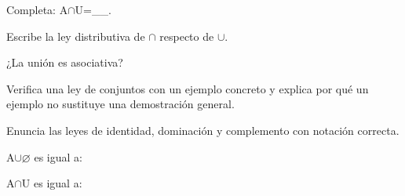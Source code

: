 \begin{activity}[id=dia-19-corta-04,type=short,weight=1]

Completa: A\(\cap\)U=__.

\end{activity}

\begin{activity}[id=dia-19-corta-05,type=short,weight=1]

Escribe la ley distributiva de \(\cap\) respecto de \(\cup\).

\end{activity}

\begin{activity}[id=dia-19-corta-06,type=short,weight=1]

¿La unión es asociativa?

\end{activity}

\begin{activity}[id=dia-19-desarrollo-01,type=long,weight=2]

Verifica una ley de conjuntos con un ejemplo concreto y explica por qué un ejemplo no sustituye una demostración general.

\end{activity}

\begin{activity}[id=dia-19-desarrollo-02,type=long,weight=2]

Enuncia las leyes de identidad, dominación y complemento con notación correcta.

\end{activity}

\begin{activity}[id=dia-19-opcion-01,type=choice,weight=1]

A\(\cup\)\(\varnothing\) es igual a:





\end{activity}

\begin{activity}[id=dia-19-opcion-02,type=choice,weight=1]

A\(\cap\)U es igual a:





\end{activity}

